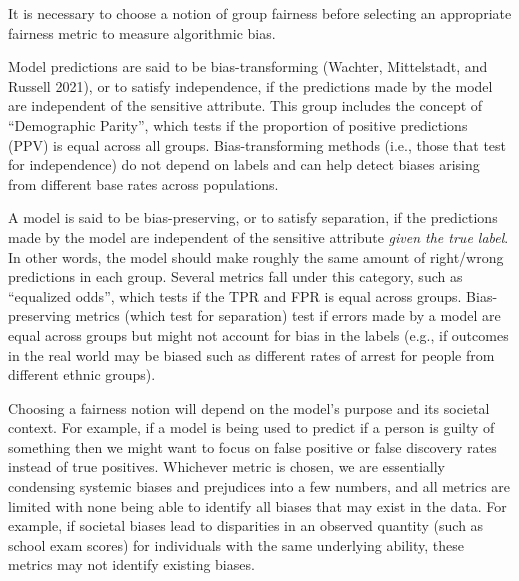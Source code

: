 It is necessary to choose a notion of group fairness before selecting an
appropriate fairness metric to measure algorithmic bias.

Model predictions are said to be
bias-transforming
(Wachter, Mittelstadt, and Russell 2021), or to satisfy
independence, if the
predictions made by the model are independent of the sensitive
attribute. This group includes the concept of ``Demographic
Parity'', which tests if the proportion of
positive predictions (PPV) is equal
across all groups. Bias-transforming methods (i.e., those that test for
independence) do not depend on labels and can help detect biases arising
from different base rates across populations.

A model is said to be
bias-preserving,
or to satisfy separation, if the
predictions made by the model are independent of the sensitive attribute
\emph{given the true label}. In other words, the model should make
roughly the same amount of right/wrong predictions in each group.
Several metrics fall under this category, such as ``equalized
odds'', which tests if the
TPR and FPR is
equal across groups. Bias-preserving metrics (which test for separation)
test if errors made by a model are equal across groups but might not
account for bias in the labels (e.g., if outcomes in the real world may
be biased such as different rates of arrest for people from different
ethnic groups).

Choosing a fairness notion will depend on the model's purpose and its
societal context. For example, if a model is being used to predict if a
person is guilty of something then we might want to focus on false
positive or false discovery rates instead of true positives. Whichever
metric is chosen, we are essentially condensing systemic biases and
prejudices into a few numbers, and all metrics are limited with none
being able to identify all biases that may exist in the data. For
example, if societal biases lead to disparities in an observed quantity
(such as school exam scores) for individuals with the same underlying
ability, these metrics may not identify existing biases.

